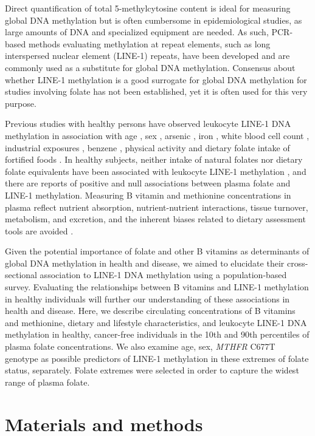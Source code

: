 \noindent Direct quantification of total 5-methylcytosine content is ideal for measuring global DNA methylation but is often cumbersome in epidemiological studies, as large amounts of DNA and specialized equipment are needed. As such, PCR-based methods evaluating methylation at repeat elements, such as long interspersed nuclear element (LINE-1) repeats, have been developed and are commonly used as a substitute for global DNA methylation. Consensus about whether LINE-1 methylation is a good surrogate for global DNA methylation for studies involving folate has not been established, yet it is often used for this very purpose.

\noindent Previous studies with healthy persons have observed leukocyte LINE-1 DNA methylation in association with age \cite{c37,c38,c39}, sex \cite{c310,c313}, arsenic \cite{c311}, iron \cite{c311}, white blood cell count \cite{c310}, industrial exposures \cite{c314}, benzene \cite{c315}, physical activity \cite{c316} and dietary folate intake of fortified foods \cite{c317}. In healthy subjects, neither intake of natural folates nor dietary folate equivalents have been associated with leukocyte LINE-1 methylation \cite{c317}, and there are reports of positive \cite{c318} and null associations \cite{c319} between plasma folate and LINE-1 methylation. Measuring B vitamin and methionine concentrations in plasma reflect nutrient absorption, nutrient-nutrient interactions, tissue turnover, metabolism, and excretion, and the inherent biases related to dietary assessment tools are avoided \cite{c320}.

\noindent Given the potential importance of folate and other B vitamins as determinants of global DNA methylation in health and disease, we aimed to elucidate their cross-sectional association to LINE-1 DNA methylation using a population-based survey. Evaluating the relationships between B vitamins and LINE-1 methylation in healthy individuals will further our understanding of these associations in health and disease. Here, we describe circulating concentrations of B vitamins and methionine, dietary and lifestyle characteristics, and leukocyte LINE-1 DNA methylation in healthy, cancer-free individuals in the 10th and 90th percentiles of plasma folate concentrations. We also examine age, sex, \emph{MTHFR} C677T genotype as possible predictors of LINE-1 methylation in these extremes of folate status, separately. Folate extremes were selected in order to capture the widest range of plasma folate. 

\section[]{Materials and methods} %
